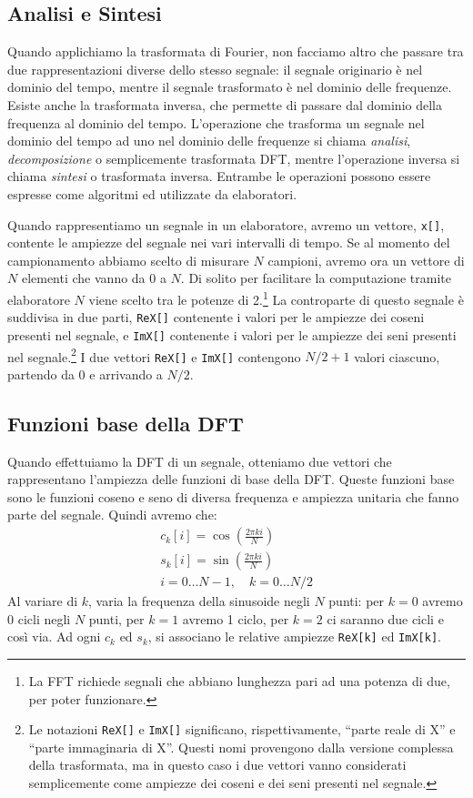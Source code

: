 \subsection{Analisi e Sintesi}
\label{analisi_sintesi}
Quando applichiamo la trasformata di Fourier, non facciamo altro che passare tra
due rappresentazioni diverse dello stesso segnale: il segnale originario \`e nel
dominio del tempo, mentre il segnale trasformato \`e nel dominio delle
frequenze. Esiste anche la trasformata inversa, che permette di passare dal
dominio della frequenza al dominio del tempo.
L'operazione che trasforma un segnale nel dominio del tempo ad uno nel dominio
delle frequenze si chiama \emph{analisi}, \emph{decomposizione} o semplicemente
{trasformata DFT}, mentre l'operazione inversa si chiama \emph{sintesi} o
{trasformata inversa}. Entrambe le operazioni possono essere espresse come
algoritmi ed utilizzate da elaboratori.

Quando rappresentiamo un segnale in un elaboratore, avremo un vettore,
\texttt{x[]}, contente le ampiezze del segnale nei vari intervalli di tempo. Se
al momento del campionamento abbiamo scelto di misurare $N$ campioni, avremo ora
un vettore di $N$ elementi che vanno da 0 a $N$. Di solito per facilitare la
computazione tramite elaboratore $N$ viene scelto tra le potenze di
2.\footnote{La \ac{FFT} richiede segnali che abbiano lunghezza pari ad una potenza di
due, per poter funzionare.} La controparte di questo segnale \`e suddivisa in
due parti, \texttt{ReX[]} contenente i valori per le ampiezze dei coseni
presenti nel segnale, e \texttt{ImX[]} contenente i valori per le ampiezze dei
seni presenti nel segnale.\footnote{Le notazioni \texttt{ReX[]} e \texttt{ImX[]}
significano, rispettivamente, ``parte reale di X'' e ``parte immaginaria di X''.
Questi nomi provengono dalla versione complessa della trasformata, ma in questo
caso i due vettori vanno considerati semplicemente come ampiezze dei coseni e
dei seni presenti nel segnale.} I due vettori \texttt{ReX[]} e \texttt{ImX[]}
contengono $N/2 + 1$ valori ciascuno, partendo da 0 e arrivando a $N/2$.

\subsection{Funzioni base della DFT}
Quando effettuiamo la DFT di un segnale, otteniamo due vettori che rappresentano
l'ampiezza delle funzioni di base della DFT. Queste funzioni base sono le
funzioni coseno e seno di diversa frequenza e ampiezza unitaria che fanno parte
del segnale. Quindi avremo che:
\[
\begin{array}{c}
c_k[i] = \cos\left(\frac{2\pi ki}{N}\right)\\[0.5em]
s_k[i] = \sin\left(\frac{2\pi ki}{N}\right)\\[0.5em]
i = 0\dots N-1, \quad k = 0 \dots N/2
\end{array}
\]
Al variare di $k$, varia la frequenza della sinusoide negli $N$ punti: per $k =
0$ avremo $0$ cicli negli $N$ punti, per $k=1$ avremo 1 ciclo, per $k=2$ ci
saranno due cicli e cos\`i via. Ad ogni $c_k$ ed $s_k$, si associano le relative
ampiezze \texttt{ReX[k]} ed \texttt{ImX[k]}.

